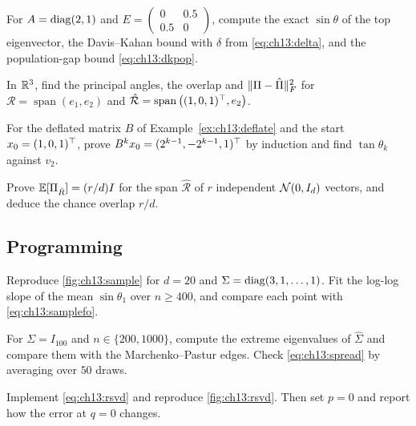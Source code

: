 \begin{exercise}\label{exr:ch13:dk}
For $A=\operatorname{diag}(2,1)$ and $E=\begin{pmatrix}0&0.5\\0.5&0\end{pmatrix}$, compute the
exact $\sin\theta$ of the top eigenvector, the Davis--Kahan bound with $\delta$
from \cref{eq:ch13:delta}, and the population-gap bound \cref{eq:ch13:dkpop}.
\end{exercise}

\begin{exercise}\label{exr:ch13:angles3}
In $\mathbb{R}^3$, find the principal angles, the overlap and $\lVert \Pi-\hat\Pi\rVert_F^2$ for
$\mathcal R=\operatorname{span}(e_1,e_2)$ and
$\hat{\mathcal R}=\operatorname{span}\big((1,0,1)^{\top},e_2\big)$.
\end{exercise}

\begin{exercise}\label{exr:ch13:deflate}
For the deflated matrix $B$ of Example~\ref{ex:ch13:deflate} and the start
$x_0=(1,0,1)^{\top}$, prove $B^kx_0=(2^{k-1},-2^{k-1},1)^{\top}$ by induction and find
$\tan\theta_k$ against $v_2$.
\end{exercise}

\begin{exercise}\label{exr:ch13:chance}
Prove $\mathbb{E}[\Pi_{\hat R}]=(r/d)I$ for the span $\hat{\mathcal R}$ of $r$ independent
$\mathcal{N}(0,I_d)$ vectors, and deduce the chance overlap $r/d$.
\end{exercise}

\subsection*{Programming}

\begin{exercise}\label{exr:ch13:simsample}
Reproduce \cref{fig:ch13:sample} for $d=20$ and $\Sigma=\operatorname{diag}(3,1,\dots,1)$. Fit the
log-log slope of the mean $\sin\theta_1$ over $n\ge400$, and compare each point
with \cref{eq:ch13:samplefo}.
\end{exercise}

\begin{exercise}\label{exr:ch13:mpcode}
For $\Sigma=I_{100}$ and $n\in\{200,1000\}$, compute the extreme eigenvalues of
$\hat\Sigma$ and compare them with the Marchenko--Pastur edges. Check
\cref{eq:ch13:spread} by averaging over $50$ draws.
\end{exercise}

\begin{exercise}\label{exr:ch13:rsvdcode}
Implement \cref{eq:ch13:rsvd} and reproduce \cref{fig:ch13:rsvd}. Then set $p=0$
and report how the error at $q=0$ changes.
\end{exercise}

